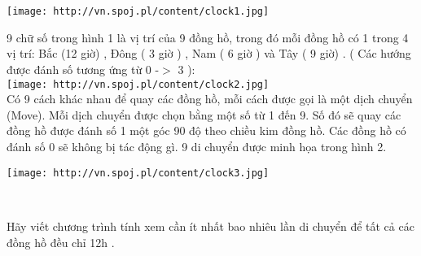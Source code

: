  

 


\texttt{[image: http://vn.spoj.pl/content/clock1.jpg]}

9 chữ số trong hình 1 là vị trí của 9 đồng hồ, trong đó mỗi đồng hồ có 1 trong 4 vị trí: Bắc (12 giờ) , Đông ( 3 giờ ) , Nam ( 6 giờ ) và Tây ( 9 giờ) . ( Các hướng được đánh số tương ứng từ 0 -$>$ 3 ):
\\
\texttt{[image: http://vn.spoj.pl/content/clock2.jpg]}
\\Có 9 cách khác nhau để quay các đồng hồ, mỗi cách được gọi là một dịch chuyển (Move). Mỗi dịch chuyển được chọn bằng một số từ 1 đến 9. Số đó sẽ quay các đồng hồ được đánh số 1 một góc 90 độ theo chiều kim đồng hồ. Các đồng hồ có đánh số 0 sẽ không bị tác động gì. 9 di chuyển được minh họa trong hình 2.


\texttt{[image: http://vn.spoj.pl/content/clock3.jpg]}

 

Hãy viết chương trình tính xem cần ít nhất bao nhiêu lần di chuyển để tất cả các đồng hồ đều chỉ 12h .
